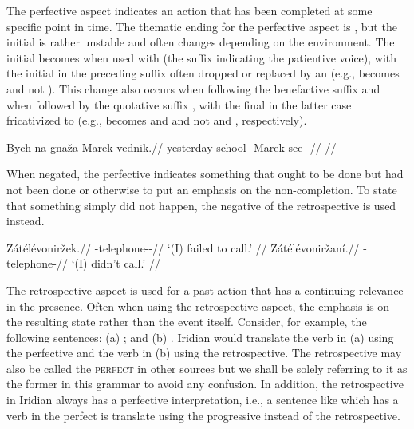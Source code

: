 The perfective aspect indicates an action that has been completed at some
specific point in time. The thematic ending for the perfective aspect is
, but the initial  is rather unstable and often changes
depending on the environment. The initial  becomes  when used
with  (the suffix indicating the patientive voice), with the initial
 in the preceding suffix often dropped or replaced by an  (e.g.,
 becomes  and not ).
This change also occurs when following the benefactive suffix  and when
followed by the quotative suffix , with the final  in the latter
case fricativized to  (e.g.,  becomes
 and  and not
 and , respectively).

\pex
\begingl
\gla Bych na gnaža Marek vednik.//
\glb yesterday \Loc{} school-\Acc{} Marek see-\Pv{}-\Pf{}//
\glft {}//
\endgl
\xe

When negated, the perfective indicates something that ought to be done but had
not been done or otherwise to put an emphasis on the non-completion. To state
that something simply did not happen, the negative of the retrospective is used
instead.

\begin{multicols}{2}
\pex
\a\begingl
\gla Zátélévoniržek.//
\glb \Neg{}-telephone-\Av{}-\Pf{}//
\glft `(I) failed to call.' //
\endgl
\a\begingl
\gla Zátélévoniržaní.//
\glb \Neg{}-telephone-//
\glft `(I) didn't call.' //
\endgl
\xe
\end{multicols}

\par The retrospective aspect is used for a past action that has a continuing
relevance in the presence. Often when using the retrospective aspect, the
emphasis is on the resulting state rather than the event itself. Consider, for
example, the following sentences: (a) ; and
(b) . Iridian would translate the
verb in (a) using the perfective and the verb in (b) using the retrospective.
The retrospective may also be called the {\scshape perfect} in other sources but
we shall be solely referring to it as the former in this grammar to avoid any
confusion. In addition, the retrospective in Iridian always has a perfective
interpretation, i.e., a sentence like 
which has a verb in the perfect is translate using the progressive instead of
the retrospective.

